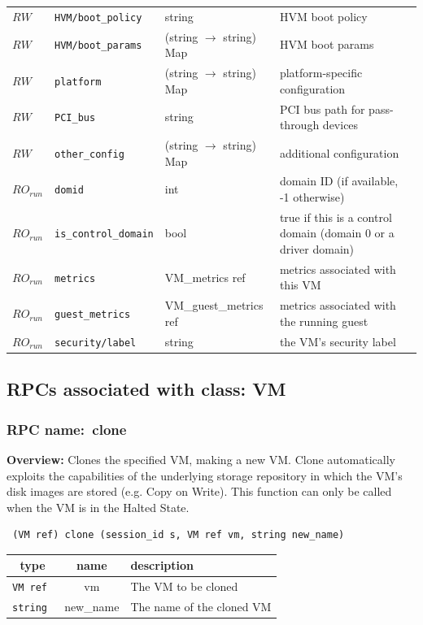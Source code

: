 \begin{longtable}{|lllp{}|}
$\mathit{RW}$ &  {\tt HVM/boot\_policy} & string & HVM boot policy \\
$\mathit{RW}$ &  {\tt HVM/boot\_params} & (string $\rightarrow$ string) Map & HVM boot params \\
$\mathit{RW}$ &  {\tt platform} & (string $\rightarrow$ string) Map & platform-specific configuration \\
$\mathit{RW}$ &  {\tt PCI\_bus} & string & PCI bus path for pass-through devices \\
$\mathit{RW}$ &  {\tt other\_config} & (string $\rightarrow$ string) Map & additional configuration \\
$\mathit{RO}_\mathit{run}$ &  {\tt domid} & int & domain ID (if available, -1 otherwise) \\
$\mathit{RO}_\mathit{run}$ &  {\tt is\_control\_domain} & bool & true if this is a control domain (domain 0 or a driver domain) \\
$\mathit{RO}_\mathit{run}$ &  {\tt metrics} & VM\_metrics ref & metrics associated with this VM \\
$\mathit{RO}_\mathit{run}$ &  {\tt guest\_metrics} & VM\_guest\_metrics ref & metrics associated with the running guest \\
$\mathit{RO}_\mathit{run}$ &  {\tt security/label} & string & the VM's security label \\
\hline
\end{longtable}
\subsection{RPCs associated with class: VM}
\subsubsection{RPC name:~clone}

{\bf Overview:} 
Clones the specified VM, making a new VM. Clone automatically exploits the
capabilities of the underlying storage repository in which the VM's disk
images are stored (e.g. Copy on Write).   This function can only be called
when the VM is in the Halted State.

\begin{verbatim} (VM ref) clone (session_id s, VM ref vm, string new_name)\end{verbatim}



 
\vspace{0.3cm}
\begin{tabular}{|c|c|p{7cm}|}
 \hline
{\bf type} & {\bf name} & {\bf description} \\ \hline
{\tt VM ref } & vm & The VM to be cloned \\ \hline 

{\tt string } & new\_name & The name of the cloned VM \\ \hline 

\end{tabular}

